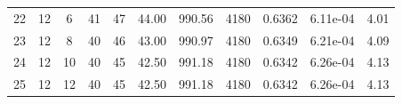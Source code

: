 {\begin{longtable}{|c|c|c|c|c|c|c|c|c|c|c|}
            22           & 12             & 6              & 41                  & 47                   & 44.00                & 990.56            & 4180               & 0.6362               & 6.11e-04         & 4.01            \\
            23           & 12             & 8              & 40                  & 46                   & 43.00                & 990.97            & 4180               & 0.6349               & 6.21e-04         & 4.09            \\
            24           & 12             & 10             & 40                  & 45                   & 42.50                & 991.18            & 4180               & 0.6342               & 6.26e-04         & 4.13            \\
            25           & 12             & 12             & 40                  & 45                   & 42.50                & 991.18            & 4180               & 0.6342               & 6.26e-04         & 4.13            \\ \hline
        \end{longtable}
    }

